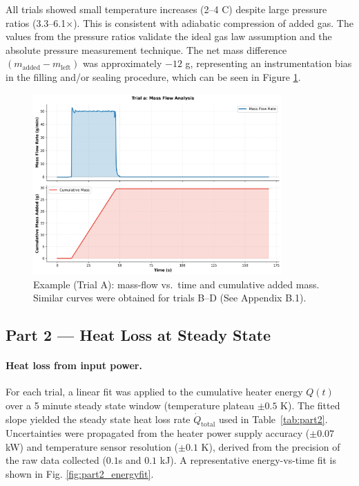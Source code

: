 \documentclass[12pt]{article}
\begin{document}
All trials showed small temperature increases (2–4 \textdegree C) despite large pressure ratios (3.3–6.1×). This is consistent with adiabatic compression of added gas. The values from the pressure ratios validate the ideal gas law assumption and the absolute pressure measurement technique. The net mass difference $(m_{\text{added}} - m_{\text{left}})$ was approximately $-12$ g, representing an instrumentation bias in the filling and/or sealing procedure, which can be seen in Figure \ref{fig:part1_massflow}.

\begin{figure}[H]
\centering
\includegraphics[width=0.85\textwidth]{graphs/part1_trial_a_mass_flow.png}
\caption{Example (Trial A): mass-flow vs.\ time and cumulative added mass. Similar curves were obtained for trials B--D (See Appendix B.1).}
\label{fig:part1_massflow}
\end{figure}

\subsection*{Part 2 — Heat Loss at Steady State}
\paragraph{Heat loss from input power.} For each trial, a linear fit was applied to the cumulative heater energy $Q(t)$ over a 5 minute steady state window (temperature plateau $\pm 0.5$ K). The fitted slope yielded the steady state heat loss rate $\dot{Q}_{\text{total}}$ used in Table~\ref{tab:part2}. Uncertainties were propagated from the heater power supply accuracy ($\pm 0.07$ kW) and temperature sensor resolution ($\pm 0.1$ K), derived from the precision of the raw data collected ($0.1$s and $0.1$ kJ). A representative energy-vs-time fit is shown in Fig. \ref{fig:part2_energyfit}.
\end{document}
